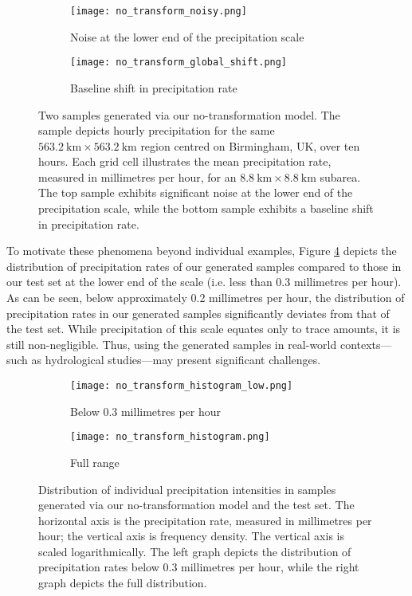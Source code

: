 \documentclass[ oneside,%
                    author={George Herbert},
                    degree={MSci},
                     title={Diffusion Models for Time-Evolving Precipitation Fields},
                  subtitle={}]{dissertation}
\begin{document}
\begin{figure}[htbp]
      \centering
      \begin{subfigure}{\textwidth}
            \texttt{[image: no\_transform\_noisy.png]}
            \caption{Noise at the lower end of the precipitation scale}
            \label{fig:no_transform_sample}
      \end{subfigure}
      \begin{subfigure}{\textwidth}
            \texttt{[image: no\_transform\_global\_shift.png]}
            \caption{Baseline shift in precipitation rate}
            \label{fig:no_transform_global_shift}
      \end{subfigure}
      \caption{Two samples generated via our no-transformation model. The sample depicts hourly precipitation for the same $563.2\ \mathrm{km} \times 563.2\ \mathrm{km}$ region centred on Birmingham, UK, over ten hours. Each grid cell illustrates the mean precipitation rate, measured in millimetres per hour, for an $8.8 \ \mathrm{km} \times 8.8\ \mathrm{km}$ subarea. The top sample exhibits significant noise at the lower end of the precipitation scale, while the bottom sample exhibits a baseline shift in precipitation rate.}
\end{figure}

To motivate these phenomena beyond individual examples, Figure \ref{fig:no_transform_histogram_low} depicts the distribution of precipitation rates of our generated samples compared to those in our test set at the lower end of the scale (i.e. less than 0.3 millimetres per hour). As can be seen, below approximately 0.2 millimetres per hour, the distribution of precipitation rates in our generated samples significantly deviates from that of the test set. While precipitation of this scale equates only to trace amounts, it is still non-negligible. Thus, using the generated samples in real-world contexts---such as hydrological studies---may present significant challenges.

\begin{figure}[htbp]
      \centering
      \begin{subfigure}{0.49\textwidth}
            \texttt{[image: no\_transform\_histogram\_low.png]}
            \caption{Below 0.3 millimetres per hour}
            \label{fig:no_transform_histogram_low}
      \end{subfigure}
      \begin{subfigure}{0.49\textwidth}
            \texttt{[image: no\_transform\_histogram.png]}
            \caption{Full range}
            \label{fig:no_transform_histogram_high}
      \end{subfigure}
      \caption{Distribution of individual precipitation intensities in samples generated via our no-transformation model and the test set. The horizontal axis is the precipitation rate, measured in millimetres per hour; the vertical axis is frequency density. The vertical axis is scaled logarithmically. The left graph depicts the distribution of precipitation rates below 0.3 millimetres per hour, while the right graph depicts the full distribution.}
      \label{fig:no_transform_histogram}
\end{figure}
\end{document}
